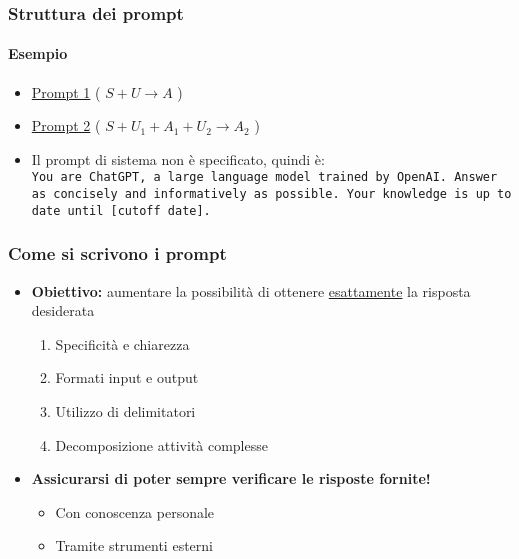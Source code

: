 \begin{exampleframe}
    \frametitle{Struttura dei prompt}
    \framesubtitle{Esempio}

    \begin{itemize}
        \item \href{https://chatgpt.com/share/6759a21f-19ec-8003-a172-e0630eae761d}{Prompt 1} ( $\boxed{S + U} \rightarrow A$ )
        \item \href{https://chatgpt.com/share/67605a8c-2fec-8003-8e82-c54f49687c1b}{Prompt 2} ( $\boxed{S + U_1 + A_1 + U_2} \rightarrow A_2$ )

        \bigskip
        \item Il prompt di sistema non è specificato, quindi è:\\
            \texttt{You are ChatGPT, a large language model trained by OpenAI. Answer as concisely and informatively as possible. Your knowledge is up to date until [cutoff date].}
    \end{itemize}
\end{exampleframe}


\begin{contentframe}
    \frametitle{Come si scrivono i prompt}

    \begin{itemize}
        \item \textbf{Obiettivo:} aumentare la possibilità di ottenere \underline{esattamente} la risposta desiderata
        \begin{enumerate}%
            \item Specificità e chiarezza
            \item Formati input e output
            \item Utilizzo di delimitatori
            \item Decomposizione attività complesse
        \end{enumerate}
        
        \bigskip
        \item \textbf{Assicurarsi di poter sempre verificare le risposte fornite!}
        \begin{itemize}
            \item Con conoscenza personale
            \item Tramite strumenti esterni
        \end{itemize}
    \end{itemize}
\end{contentframe}


